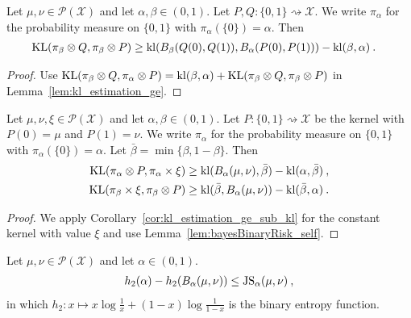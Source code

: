 \begin{corollary}
  \label{cor:kl_estimation_ge_sub_kl}
  Let $\mu, \nu \in \mathcal P(\mathcal X)$ and let $\alpha, \beta \in (0, 1)$. Let $P, Q : \{0,1\} \rightsquigarrow \mathcal X$. We write $\pi_\alpha$ for the probability measure on $\{0,1\}$ with $\pi_\alpha(\{0\}) = \alpha$. Then
  \begin{align*}
  \operatorname{KL}(\pi_\beta \otimes Q, \pi_\beta \otimes P)
  &\ge \operatorname{kl}(B_\beta(Q(0), Q(1)), B_\alpha(P(0), P(1))) - \operatorname{kl}(\beta, \alpha)
  \: .
  \end{align*}
\end{corollary}

\begin{proof}%
{}
Use $\operatorname{KL}(\pi_\beta \otimes Q, \pi_\alpha \otimes P) = \operatorname{kl}(\beta, \alpha) + \operatorname{KL}(\pi_\beta \otimes Q, \pi_\beta \otimes P)$ in Lemma~\ref{lem:kl_estimation_ge}.
\end{proof}


\begin{lemma}
  \label{lem:kl_estimation_ge_prod}
  Let $\mu, \nu, \xi \in \mathcal P(\mathcal X)$ and let $\alpha, \beta \in (0, 1)$. Let $P : \{0,1\} \rightsquigarrow \mathcal X$ be the kernel with $P(0) = \mu$ and $P(1) = \nu$. We write $\pi_\alpha$ for the probability measure on $\{0,1\}$ with $\pi_\alpha(\{0\}) = \alpha$. Let $\bar{\beta} = \min\{\beta, 1 - \beta\}$.
  Then
  \begin{align*}
  \operatorname{KL}(\pi_\alpha \otimes P, \pi_\alpha \times \xi)
  &\ge \operatorname{kl}(B_\alpha(\mu, \nu), \bar{\beta}) - \operatorname{kl}(\alpha, \bar{\beta})
  \: , \\
  \operatorname{KL}(\pi_\beta \times \xi, \pi_\beta \otimes P)
  &\ge \operatorname{kl}(\bar{\beta}, B_\alpha(\mu, \nu)) - \operatorname{kl}(\bar{\beta}, \alpha)
  \: .
  \end{align*}
\end{lemma}

\begin{proof}%
{}
We apply Corollary~\ref{cor:kl_estimation_ge_sub_kl} for the constant kernel with value $\xi$ and use Lemma~\ref{lem:bayesBinaryRisk_self}.
\end{proof}


\begin{theorem}
  \label{thm:sub_bayesBinaryRisk_le_jensenShannon}
  Let $\mu, \nu \in \mathcal P(\mathcal X)$ and let $\alpha \in (0, 1)$.
  \begin{align*}
  h_2(\alpha) - h_2(B_\alpha(\mu, \nu)) \le \operatorname{JS}_\alpha(\mu, \nu) \: ,
  \end{align*}
  in which $h_2: x \mapsto x\log\frac{1}{x} + (1 - x)\log\frac{1}{1 - x}$ is the binary entropy function.
\end{theorem}

